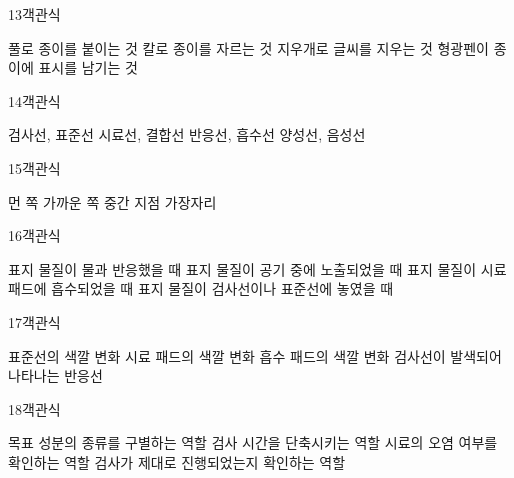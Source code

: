 \documentclass[fs9,seriesRus]{korfarm-base}
\begin{document}
\begin{kfQBlock}{13}{객관식}
\begin{kfChoices}
\kfChoice 풀로 종이를 붙이는 것
\kfChoice 칼로 종이를 자르는 것
\kfChoice 지우개로 글씨를 지우는 것
\kfChoice 형광펜이 종이에 표시를 남기는 것
\end{kfChoices}
\end{kfQBlock}
\begin{kfQBlock}{14}{객관식}
\begin{kfChoices}
\kfChoice 검사선, 표준선
\kfChoice 시료선, 결합선
\kfChoice 반응선, 흡수선
\kfChoice 양성선, 음성선
\end{kfChoices}
\end{kfQBlock}
\begin{kfQBlock}{15}{객관식}
\begin{kfChoices}
\kfChoice 먼 쪽
\kfChoice 가까운 쪽
\kfChoice 중간 지점
\kfChoice 가장자리
\end{kfChoices}
\end{kfQBlock}
\begin{kfQBlock}{16}{객관식}
\begin{kfChoices}
\kfChoice 표지 물질이 물과 반응했을 때
\kfChoice 표지 물질이 공기 중에 노출되었을 때
\kfChoice 표지 물질이 시료 패드에 흡수되었을 때
\kfChoice 표지 물질이 검사선이나 표준선에 놓였을 때
\end{kfChoices}
\end{kfQBlock}
\begin{kfQBlock}{17}{객관식}
\begin{kfChoices}
\kfChoice 표준선의 색깔 변화
\kfChoice 시료 패드의 색깔 변화
\kfChoice 흡수 패드의 색깔 변화
\kfChoice 검사선이 발색되어 나타나는 반응선
\end{kfChoices}
\end{kfQBlock}
\begin{kfQBlock}{18}{객관식}
\begin{kfChoices}
\kfChoice 목표 성분의 종류를 구별하는 역할
\kfChoice 검사 시간을 단축시키는 역할
\kfChoice 시료의 오염 여부를 확인하는 역할
\kfChoice 검사가 제대로 진행되었는지 확인하는 역할
\end{kfChoices}
\end{kfQBlock}
\end{document}
